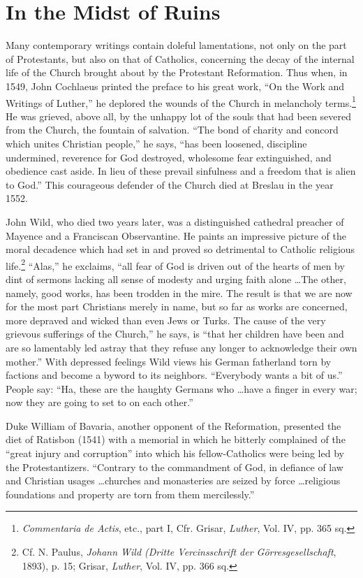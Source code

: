 \section{In the Midst of Ruins}

Many contemporary writings contain doleful lamentations, not
only on the part of Protestants, but also on that of Catholics, concerning
the decay of the internal life of the Church brought about
by the Protestant Reformation. Thus when, in 1549, John Cochlaeus
printed the preface to his great work, “On the Work and Writings
of Luther,” he deplored the wounds of the Church in melancholy
terms.\footnote{\textit{Commentaria de Actis}, etc., part I, Cfr. Grisar, \textit{Luther}, Vol. IV, pp. 365 sq.}
 He was grieved, above all, by the unhappy lot of the souls
that had been severed from the Church, the fountain of salvation.
“The bond of charity and concord which unites Christian people,”
he says, “has been loosened, discipline undermined, reverence for God
destroyed, wholesome fear extinguished, and obedience cast aside. In
lieu of these prevail sinfulness and a freedom that is alien to God.”
This courageous defender of the Church died at Breslau in the year
1552.

John Wild, who died two years later, was a distinguished cathedral preacher of
Mayence and a Franciscan Observantine. He paints an impressive picture of the
moral decadence which had set in and proved so detrimental to Catholic
religious life.\footnote {Cf. N. Paulus, \textit{Johann Wild (Dritte
Vercinsschrift der Görresgesellschaft}, 1893), p. 15; Grisar, \textit{Luther},
Vol. IV, pp. 366 sq.} “Alas,” he exclaims, “all fear of God is driven out of
the hearts of men by dint of sermons lacking all sense of modesty and urging
faith alone \dots The other, namely, good works, has been trodden in the mire.
The result is that we are now for the most part Christians merely in name, but
so far as works are concerned, more depraved and wicked than even Jews or
Turks. The cause of the very grievous sufferings of the Church,” he says, is
“that her children have been and are so lamentably led astray that they refuse
any longer to acknowledge their own mother.” With depressed feelings Wild views
his German fatherland torn by factions and become a byword to its neighbors.
“Everybody wants a bit of us.” People say: “Ha, these are the haughty Germans
who \dots have a finger in every war; now they are going to set to on each
other.”

Duke William of Bavaria, another opponent of the Reformation,
presented the diet of Ratisbon (1541) with a memorial in which
he bitterly complained of the “great injury and corruption” into
which his fellow-Catholics were being led by the Protestantizers.
“Contrary to the commandment of God, in defiance of law and Christian
usages \dots churches and monasteries are seized by force \dots religious
foundations and property are torn from them mercilessly.”

